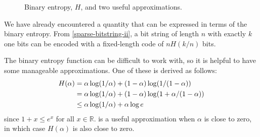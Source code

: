 \documentclass{patmorin}
\begin{document}
\begin{figure}
  \caption{Binary entropy, $H$, and two useful approximations.}
\end{figure}

We have already encountered a quantity that can be
expressed in terms of the binary entropy.  From
\eqref{sparse-bitstring-ii}, a bit string of length $n$ with
exactly $k$ one bits can be encoded with a fixed-length code of 
$nH(k/n)$ bits.

The binary entropy function can be difficult to work with, so it is
helpful to have some manageable approximations.  One of these is
derived as follows:
\begin{align}
  H(\alpha) & = \alpha\log(1/\alpha) + (1-\alpha)\log(1/(1-\alpha)) \notag \\
            & = \alpha\log(1/\alpha) + (1-\alpha)\log(1+\alpha/(1-\alpha)) \notag \\
            & \le \alpha\log(1/\alpha) + \alpha\log e \eqlabel{entropy-i} 
\end{align}
since $1+x\le e^x$ for all $x\in\mathbb{R}$.  is a
useful approximation when $\alpha$ is close to zero, in which case 
$H(\alpha)$ is also close to zero.
\end{document}
